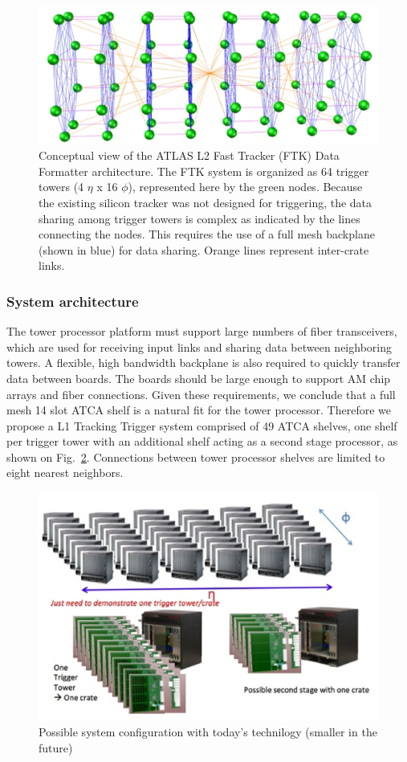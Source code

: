 \begin{figure}[ht!]
\centering
\includegraphics[width=0.7\columnwidth]{Plots/TT_config_ATLAS.eps}
\caption{Conceptual view of the ATLAS L2 Fast Tracker (FTK) Data Formatter architecture.  The FTK system is organized as 64 trigger towers (4 $\eta$ x 16 $\phi$), represented here by the green nodes.  Because the existing silicon tracker was not designed for triggering, the data sharing among trigger towers is complex as indicated by the lines connecting the nodes.  This requires the use of a full mesh backplane (shown in blue) for data sharing.  Orange lines represent inter-crate links.}
\label{fig:TT_config_ATLAS}
\end{figure}

\subsubsection{System architecture}

\noindent The tower processor platform must support large numbers of fiber transceivers, which are used for receiving input links and sharing data between neighboring towers.  A flexible, high bandwidth backplane is also required to quickly transfer data between boards.  The boards should be large enough to support AM chip arrays and fiber connections.  Given these requirements, we conclude that a full mesh 14 slot ATCA shelf is a natural fit for the tower processor.  Therefore we propose a L1 Tracking Trigger system comprised of 49 ATCA shelves, one shelf per trigger tower with an additional shelf acting as a second stage processor, as shown on Fig.~\ref{fig:System_1}. Connections between tower processor shelves are limited to eight nearest neighbors.

\begin{figure}[ht!]
\centering
\includegraphics[width=0.7\columnwidth]{Plots/System_1.eps}
\caption{Possible system configuration with today's technilogy (smaller in the future)}
\label{fig:System_1}
\end{figure}

